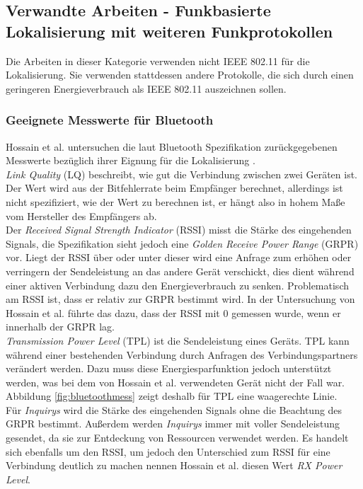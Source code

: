 \subsection{Verwandte Arbeiten - Funkbasierte Lokalisierung mit weiteren Funkprotokollen}
Die Arbeiten in dieser Kategorie verwenden nicht IEEE 802.11 für die Lokalisierung.
Sie verwenden stattdessen andere Protokolle, die sich durch einen geringeren Energieverbrauch als IEEE 802.11 auszeichnen sollen.

\subsubsection{Geeignete Messwerte für Bluetooth}
Hossain et al. untersuchen die laut Bluetooth Spezifikation zurückgegebenen Messwerte bezüglich ihrer Eignung für die Lokalisierung \cite{hossain2007comprehensive}.\\ 
\emph{Link Quality} (LQ) beschreibt, wie gut die Verbindung zwischen zwei Geräten ist.
Der Wert wird aus der Bitfehlerrate beim Empfänger berechnet, allerdings ist nicht spezifiziert, wie der Wert zu berechnen ist, er hängt also in hohem Maße vom Hersteller des Empfängers ab. \\
Der \emph{Received Signal Strength Indicator} (RSSI) misst die Stärke des eingehenden Signals, die Spezifikation sieht jedoch eine \emph{Golden Receive Power Range} (GRPR) vor. 
Liegt der RSSI über oder unter dieser wird eine Anfrage zum erhöhen oder verringern der Sendeleistung an das andere Gerät verschickt, dies dient während einer aktiven Verbindung dazu den Energieverbrauch zu senken.
Problematisch am RSSI ist, dass er relativ zur GRPR bestimmt wird.
In der Untersuchung von Hossain et al. führte das dazu, dass der RSSI mit 0 gemessen wurde, wenn er innerhalb der GRPR lag. \\
\emph{Transmission Power Level} (TPL) ist die Sendeleistung eines Geräts. 
TPL kann während einer bestehenden Verbindung durch Anfragen des Verbindungspartners verändert werden.
Dazu muss diese Energiesparfunktion jedoch unterstützt werden, was bei dem von Hossain et al. verwendeten Gerät nicht der Fall war.
Abbildung \ref{fig:bluetoothmess} zeigt deshalb für TPL eine waagerechte Linie.\\
Für \emph{Inquirys} wird die Stärke des eingehenden Signals ohne die Beachtung des GRPR bestimmt.
Außerdem werden \emph{Inquirys} immer mit voller Sendeleistung gesendet, da sie zur Entdeckung von Ressourcen verwendet werden.
Es handelt sich ebenfalls um den RSSI, um jedoch den Unterschied zum RSSI für eine Verbindung deutlich zu machen nennen Hossain et al. diesen Wert \emph{RX Power Level}.

